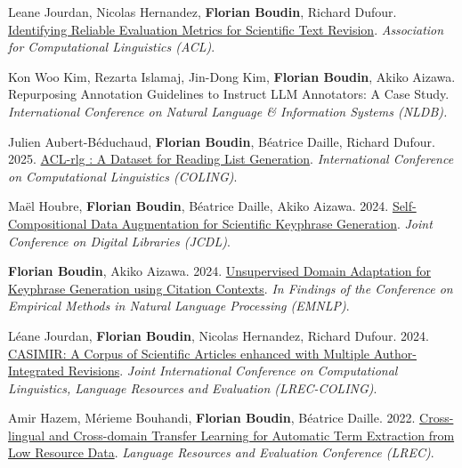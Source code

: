 \item 
Leane Jourdan, Nicolas Hernandez, \textbf{Florian Boudin}, Richard Dufour.
\href{https://arxiv.org/pdf/2506.04772}{Identifying Reliable Evaluation Metrics for Scientific Text Revision}.
\textit{Association for Computational Linguistics (ACL)}.
\label{jourdan-etal-2025-identifying}

\item 
Kon Woo Kim, Rezarta Islamaj, Jin-Dong Kim, \textbf{Florian Boudin}, Akiko Aizawa.
Repurposing Annotation Guidelines to Instruct LLM Annotators: A Case Study.
\textit{International Conference on Natural Language \& Information Systems (NLDB).}
\label{kim-etal-2025-repurposing }

\item 
Julien Aubert-Béduchaud, \textbf{Florian Boudin}, Béatrice Daille, Richard Dufour.
2025.
\href{https://aclanthology.org/2025.coling-main.327.pdf}{ACL-rlg : A Dataset for Reading List Generation}.
\textit{International Conference on Computational Linguistics (COLING)}.
\label{aubert-beduchaud-etal-2025-acl}

\item 
Maël Houbre, \textbf{Florian Boudin}, Béatrice Daille, Akiko Aizawa.
2024.
\href{https://arxiv.org/pdf/2411.03039}{Self-Compositional Data Augmentation for Scientific Keyphrase Generation}.
\textit{Joint Conference on Digital Libraries (JCDL)}.
\label{houbre-etal-2024-self}

\item
\textbf{Florian Boudin}, Akiko Aizawa.
2024.
\href{https://aclanthology.org/2024.findings-emnlp.33.pdf}{Unsupervised Domain Adaptation for Keyphrase Generation using Citation Contexts}.
\textit{In Findings of the Conference on Empirical Methods in Natural Language Processing (EMNLP)}.
\label{boudin-aizawa-2024-unsupervised}

\item 
Léane Jourdan, \textbf{Florian Boudin}, Nicolas Hernandez, Richard Dufour.
2024.
\href{https://aclanthology.org/2024.lrec-main.257.pdf}{CASIMIR: A Corpus of Scientific Articles enhanced with Multiple Author-Integrated Revisions}.
\textit{Joint International Conference on Computational Linguistics, Language Resources and Evaluation (LREC-COLING)}.
\label{jourdan-etal-2024-casimir}

\item
Amir Hazem, Mérieme Bouhandi, \textbf{Florian Boudin}, Béatrice Daille.
2022.
\href{https://aclanthology.org/2022.lrec-1.68.pdf}{Cross-lingual and Cross-domain Transfer Learning for Automatic Term Extraction from Low Resource Data}.
\textit{Language Resources and Evaluation Conference (LREC)}.
\label{hazem-etal-2022-cross}

